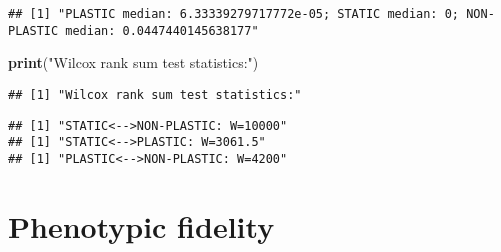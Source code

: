 \documentclass[]{book}
\newenvironment{Shaded}{\begin{snugshade}}{\end{snugshade}}
\newcommand{\ControlFlowTok}[1]{\textcolor[rgb]{0.13,0.29,0.53}{\textbf{#1}}}
\newcommand{\DataTypeTok}[1]{\textcolor[rgb]{0.13,0.29,0.53}{#1}}
\newcommand{\DecValTok}[1]{\textcolor[rgb]{0.00,0.00,0.81}{#1}}
\newcommand{\KeywordTok}[1]{\textcolor[rgb]{0.13,0.29,0.53}{\textbf{#1}}}
\newcommand{\NormalTok}[1]{#1}
\newcommand{\OperatorTok}[1]{\textcolor[rgb]{0.81,0.36,0.00}{\textbf{#1}}}
\newcommand{\OtherTok}[1]{\textcolor[rgb]{0.56,0.35,0.01}{#1}}
\newcommand{\StringTok}[1]{\textcolor[rgb]{0.31,0.60,0.02}{#1}}
\begin{document}
\begin{verbatim}
## [1] "PLASTIC median: 6.33339279717772e-05; STATIC median: 0; NON-PLASTIC median: 0.0447440145638177"
\end{verbatim}

\begin{Shaded}
\begin{Highlighting}[]
\KeywordTok{print}\NormalTok{(}\StringTok{"Wilcox rank sum test statistics:"}\NormalTok{)}
\end{Highlighting}
\end{Shaded}

\begin{verbatim}
## [1] "Wilcox rank sum test statistics:"
\end{verbatim}

\begin{Shaded}
\end{Shaded}

\begin{verbatim}
## [1] "STATIC<-->NON-PLASTIC: W=10000"
## [1] "STATIC<-->PLASTIC: W=3061.5"
## [1] "PLASTIC<-->NON-PLASTIC: W=4200"
\end{verbatim}

\hypertarget{phenotypic-fidelity}{%
\section{Phenotypic fidelity}\label{phenotypic-fidelity}}
\end{document}
